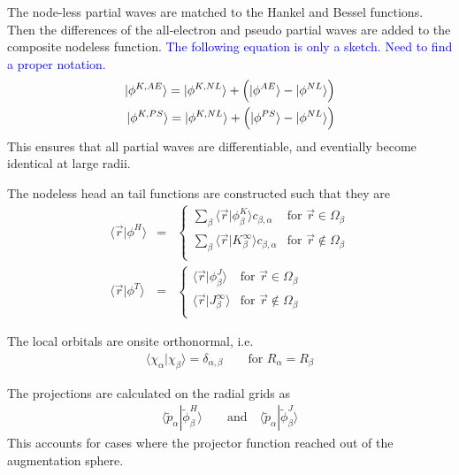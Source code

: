 \documentclass[11pt,a4paper]{report}
\begin{document}
The node-less partial waves are matched to the Hankel and Bessel
functions. Then the differences of the all-electron and pseudo partial
waves are added to the composite nodeless function.
\textcolor{blue}{The following equation is only a
  sketch. Need to find a proper notation.}
\begin{eqnarray}
|\phi^{K,AE}\rangle
=|\phi^{K,NL}\rangle+\Bigl(|\phi^{AE}\rangle-|\phi^{NL}\rangle\Bigr)
\nonumber\\
|\phi^{K,PS}\rangle
=|\phi^{K,NL}\rangle+\Bigl(|\phi^{PS}\rangle-|\phi^{NL}\rangle\Bigr)
\end{eqnarray}
This ensures that all partial waves are differentiable, and eventially
become identical at large radii.




The nodeless head an tail functions are constructed such that they are 
\begin{eqnarray}
\langle\vec{r}|\phi^H\rangle&=&
\begin{cases}
\sum_\beta 
\langle\vec{r}|\phi^K_\beta\rangle c_{\beta,\alpha}
&\text{for $\vec{r}\in\Omega_\beta$}\\
\sum_\beta \langle\vec{r}|K^\infty_\beta\rangle c_{\beta,\alpha}
&\text{for $\vec{r}\notin\Omega_\beta$}\\
\end{cases}
\nonumber\\
\langle\vec{r}|\phi^T\rangle&=&
\begin{cases}
\langle\vec{r}|\phi^J_\beta\rangle 
&\text{for $\vec{r}\in\Omega_\beta$}\\
\langle\vec{r}|J^\infty_\beta\rangle 
&\text{for $\vec{r}\notin\Omega_\beta$}\\
\end{cases}
\end{eqnarray}



The local orbitals are onsite orthonormal, i.e.
\begin{eqnarray}
\langle\chi_\alpha|\chi_\beta\rangle=\delta_{\alpha,\beta}
\qquad\text{for $R_\alpha=R_\beta$}
\end{eqnarray}




The projections are calculated on the radial grids as
\begin{eqnarray}
\langle\tilde{p}_\alpha|\tilde{\phi}^H_\beta\rangle
\qquad\text{and}\quad
\langle\tilde{p}_\alpha|\tilde{\phi}^J_\beta\rangle
\end{eqnarray}
This accounts for cases where the projector function reached out of
the augmentation sphere.
\end{document}
